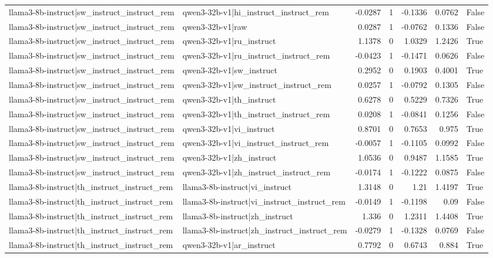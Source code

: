 \begin{table}
\begin{tabular}{l l r r r r l}
llama3-8b-instruct|sw_instruct_instruct_rem & qwen3-32b-v1|hi_instruct_instruct_rem & -0.0287 & 1 & -0.1336 & 0.0762 & False \\
llama3-8b-instruct|sw_instruct_instruct_rem & qwen3-32b-v1|raw & 0.0287 & 1 & -0.0762 & 0.1336 & False \\
llama3-8b-instruct|sw_instruct_instruct_rem & qwen3-32b-v1|ru_instruct & 1.1378 & 0 & 1.0329 & 1.2426 & True \\
llama3-8b-instruct|sw_instruct_instruct_rem & qwen3-32b-v1|ru_instruct_instruct_rem & -0.0423 & 1 & -0.1471 & 0.0626 & False \\
llama3-8b-instruct|sw_instruct_instruct_rem & qwen3-32b-v1|sw_instruct & 0.2952 & 0 & 0.1903 & 0.4001 & True \\
llama3-8b-instruct|sw_instruct_instruct_rem & qwen3-32b-v1|sw_instruct_instruct_rem & 0.0257 & 1 & -0.0792 & 0.1305 & False \\
llama3-8b-instruct|sw_instruct_instruct_rem & qwen3-32b-v1|th_instruct & 0.6278 & 0 & 0.5229 & 0.7326 & True \\
llama3-8b-instruct|sw_instruct_instruct_rem & qwen3-32b-v1|th_instruct_instruct_rem & 0.0208 & 1 & -0.0841 & 0.1256 & False \\
llama3-8b-instruct|sw_instruct_instruct_rem & qwen3-32b-v1|vi_instruct & 0.8701 & 0 & 0.7653 & 0.975 & True \\
llama3-8b-instruct|sw_instruct_instruct_rem & qwen3-32b-v1|vi_instruct_instruct_rem & -0.0057 & 1 & -0.1105 & 0.0992 & False \\
llama3-8b-instruct|sw_instruct_instruct_rem & qwen3-32b-v1|zh_instruct & 1.0536 & 0 & 0.9487 & 1.1585 & True \\
llama3-8b-instruct|sw_instruct_instruct_rem & qwen3-32b-v1|zh_instruct_instruct_rem & -0.0174 & 1 & -0.1222 & 0.0875 & False \\
llama3-8b-instruct|th_instruct_instruct_rem & llama3-8b-instruct|vi_instruct & 1.3148 & 0 & 1.21 & 1.4197 & True \\
llama3-8b-instruct|th_instruct_instruct_rem & llama3-8b-instruct|vi_instruct_instruct_rem & -0.0149 & 1 & -0.1198 & 0.09 & False \\
llama3-8b-instruct|th_instruct_instruct_rem & llama3-8b-instruct|zh_instruct & 1.336 & 0 & 1.2311 & 1.4408 & True \\
llama3-8b-instruct|th_instruct_instruct_rem & llama3-8b-instruct|zh_instruct_instruct_rem & -0.0279 & 1 & -0.1328 & 0.0769 & False \\
llama3-8b-instruct|th_instruct_instruct_rem & qwen3-32b-v1|ar_instruct & 0.7792 & 0 & 0.6743 & 0.884 & True \\

\end{tabular}
\end{table}
